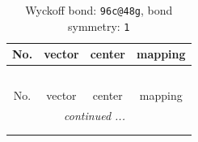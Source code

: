 \documentclass[fleqn,8pt]{jsarticle}
\begin{document}
\renewcommand{\arraystretch}{1.2}
\begin{longtable}{cccc}
\caption{Wyckoff bond: {\tt 96c@48g}, bond symmetry: {\tt 1}}
 \\
 \hline \hline
No. & vector & center & mapping \\ \hline \endfirsthead

\multicolumn{3}{l}{\tablename\ \thetable{}} \\
 \hline \hline
No. & vector & center & mapping \\ \hline \endhead

 \hline \hline
\multicolumn{3}{r}{\footnotesize\it continued ...} \\ \endfoot

 \hline \hline
\multicolumn{3}{r}{} \\ \endlastfoot


\end{longtable}
\end{document}
